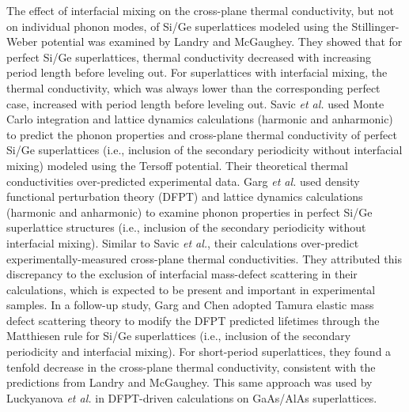 \documentclass[aps,prb,preprint,preprintnumbers,amsmath,amssymb,floatfix,superscriptaddress]{revtex4}
\begin{document}
The effect of interfacial mixing on the cross-plane thermal conductivity, but not on individual phonon modes, of Si/Ge superlattices modeled using the Stillinger-Weber potential was examined by Landry and McGaughey.\cite{PhysRevB.79.075316} They showed that for perfect Si/Ge superlattices, thermal conductivity decreased with increasing period length before leveling out. For superlattices with interfacial mixing, the thermal conductivity, which was always lower than the corresponding perfect case, increased with period length before leveling out. Savic \textit{et al.} used Monte Carlo integration and lattice dynamics calculations (harmonic and anharmonic) to predict the phonon properties and cross-plane thermal conductivity of perfect Si/Ge superlattices (i.e., inclusion of the secondary periodicity without interfacial mixing) modeled using the Tersoff potential. Their theoretical thermal conductivities over-predicted experimental data.\cite{savic:073113} Garg \textit{et al.} used density functional perturbation theory (DFPT) and lattice dynamics calculations (harmonic and anharmonic) to examine phonon properties in perfect Si/Ge superlattice structures (i.e., inclusion of the secondary periodicity without interfacial mixing).\cite{doi:10.1021/nl202186y} Similar to Savic \textit{et al.}, their calculations over-predict experimentally-measured cross-plane thermal conductivities. They attributed this discrepancy to the exclusion of interfacial mass-defect scattering in their calculations, which is expected to be present and important in experimental samples. In a follow-up study, Garg and Chen adopted Tamura elastic mass defect scattering theory \cite{tamura_isotope_1983} to modify the DFPT predicted lifetimes through the Matthiesen rule for Si/Ge superlattices (i.e., inclusion of the secondary periodicity and interfacial mixing).\cite{PhysRevB.87.140302} For short-period superlattices, they found a tenfold decrease in the cross-plane thermal conductivity, consistent with the predictions from Landry and McGaughey.\cite{PhysRevB.79.075316} This same approach was used by Luckyanova \textit{et al.} \cite{Luckyanova16112012} in DFPT-driven calculations on GaAs/AlAs superlattices.
\end{document}
